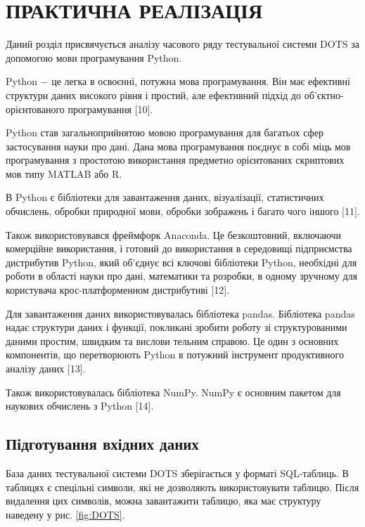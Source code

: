 \section{ПРАКТИЧНА РЕАЛІЗАЦІЯ}

Даний розділ присвячується аналізу часового ряду тестувальної системи DOTS за допомогою мови програмування Python. 

Python $-$ це легка в освоєнні, потужна мова програмування. Він має ефективні структури даних високого рівня і простий, але ефективний підхід до об'єктно-орієнтованого програмування [10].

Python став загальноприйнятою мовою програмування для багатьох сфер застосування науки про дані. Дана мова програмування поєднує в собі міць мов програмування з простотою використання предметно орієнтованих скриптових мов типу MATLAB або R. 

В Python є бібліотеки для завантаження даних, візуалізації, статистичних обчислень, обробки природної мови, обробки зображень і багато чого іншого [11].

Також використовувався фреймфорк Anaconda. Це безкоштовний, включаючи комерційне використання, і готовий до використання в середовищі підприємства дистрибутив Python, який об'єднує всі ключові бібліотеки Python, необхідні для роботи в області науки про дані, математики та розробки, в одному зручному для користувача крос-платформенном дистрибутиві [12].

Для завантаження даних використовувалась бібліотека pandas. Бібліотека pandas надає структури даних і функції, покликані зробити роботу зі структурованими даними простим, швидким та вислови тельним справою. Це один з основних компонентів, що перетворюють Python в потужний інструмент продуктивного аналізу даних [13].

Також використовувалась бібліотека NumPy. NumPy є основним пакетом для наукових обчислень з Python [14].

\subsection{Підготування вхідних даних}

База даних тестувальної системи DOTS зберігається у форматі SQL-таблиць. В таблицях є спецільні символи, які не дозволяють використовувати таблицю. Після видалення цих символів, можна завантажити таблицю, яка має структуру наведену у рис. \ref{fig:DOTS}.

